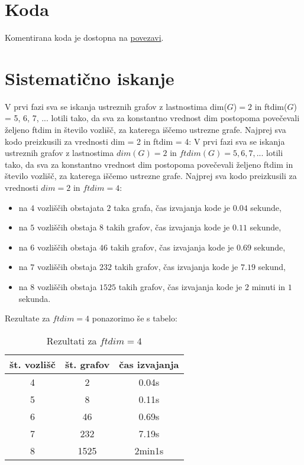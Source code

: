 \documentclass[12pt]{article}
\begin{document}
\section{Koda}
Komentirana koda je dostopna na \href{https://github.com/HanaSamsa/Problem-metricnih-dimenzij-odpornih-na-napake.git}{povezavi}.

\section{Sistematično iskanje}

V prvi fazi sva se iskanja ustreznih grafov z lastnostima dim($G$)$ =2$ in ftdim($G$) = 5, 6, 7, ... 
lotili tako, da sva za konstantno vrednost dim postopoma povečevali željeno ftdim in število vozlišč, za 
katerega iščemo ustrezne grafe. Najprej sva kodo preizkusili za vrednosti dim = 2 in ftdim = 4:
V prvi fazi sva se iskanja ustreznih grafov z lastnostima $dim(G) =2$ in $ftdim(G) = 5, 6, 7, ...$ lotili tako, da sva za 
konstantno vrednost dim postopoma povečevali željeno ftdim in število vozlišč, za katerega iščemo ustrezne grafe. Najprej sva 
kodo preizkusili za vrednosti $dim = 2$ in $ftdim = 4$:
\begin{itemize}
    \item na $4$ vozliščih obstajata $2$ taka grafa, čas izvajanja kode je $0.04$ sekunde,
    \item na $5$ vozliščih obstaja $8$ takih grafov, čas izvajanja kode je $0.11$ sekunde,
    \item na $6$ vozliščih obstaja $46$ takih grafov, čas izvajanja kode je $0.69$ sekunde,
    \item na $7$ vozliščih obstaja $232$ takih grafov, čas izvajanja kode je $7.19$ sekund,
    \item na $8$ vozliščih obstaja $1525$ takih grafov, čas izvajanja kode je $2$ minuti in $1$ sekunda.
\end{itemize}

Rezultate za $ftdim = 4$ ponazorimo še s tabelo:

\begin{table}[H] 
    \centering 
 	\begin{tabular}{|c|c|c|} 
 	\hline 
 	\textbf{št. vozlišč} & \textbf{št. grafov} & \textbf{čas izvajanja} \\
 		\hline 4 & 2 & 0.04s  \\ 
 		\hline 5 & 8 & 0.11s \\ 
 		\hline 6 & 46 & 0.69s \\ 
 		\hline 7 & 232 & 7.19s \\
 		\hline 8 & 1525 & 2min1s \\
 		\hline 
 	\end{tabular} 
 	\caption{Rezultati za $ftdim = 4$}
 	\label{tab:ftdim4}
\end{table}
\end{document}
